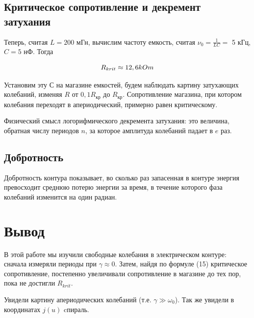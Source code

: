 \subsection{Критическое сопротивление и декремент затухания}

Теперь, считая $L = 200$ мГн, вычислим  частоту емкость, считая $\nu_0 = \frac{1}{LC} =$ 5 кГц, $C = 5$ нФ. Тогда 
 
 \begin{equation}\label{}
 R_{krit} \approx 12,6 \space kOm
 \end{equation}

Установим эту $ С $ на магазине емкостей, будем наблюдать картину затухающих колебаний, изменяя $ R $ от $ 0,1 R_{кр}$ до $ R_{кр} $. Сопротивление магазина, при котором колебания переходят в апериодический, примерно равен критическому. 

Физический смысл логорифмического декремента затухания: это величина, обратная числу периодов $ n $, за которое амплитуда колебаний падает в $ e $ раз.


\subsection{Добротность}
Добротность контура показывает, во сколько раз запасенная в контуре энергия превосходит среднюю потерю энергии  за время, в течение которого фаза колебаний изменится на один радиан.


\section{Вывод}

В этой работе мы изучили свободные колебания в электрическом контуре: сначала измеряли периоды при $ \gamma \approx 0 $.
Затем, найдя по формуле {(15)} критическое сопротивление, постепенно увеличивали сопротивление в магазине до тех пор, пока не достигли $R_{krit}$.

Увидели картину апериодических колебаний (т.е. ${\gamma \gg \omega_{0}}$).
\newline
Так же увидели в координатах $j(u)$ cпираль.


